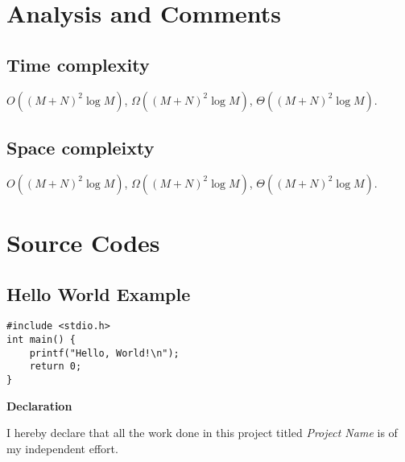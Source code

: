 \documentclass[10pt, twoside]{article}
\newcommand{\projectname}{
    Project Name
}
\begin{document}
\section{Analysis and Comments}

\subsection{Time complexity}

$O((M+N)^2 \log M)$, $\Omega((M+N)^2 \log M)$, $\Theta((M+N)^2 \log M)$.

\lipsum[4-6]


\subsection{Space compleixty}

\lipsum[2-5]

$O((M+N)^2 \log M)$, $\Omega((M+N)^2 \log M)$, $\Theta((M+N)^2 \log M)$.

\newpage

\section{Source Codes}

\subsection{Hello World Example}
\begin{verbatim}
#include <stdio.h>
int main() {
    printf("Hello, World!\n");
    return 0;
}
\end{verbatim}

\textbf{Declaration}

I hereby declare that all the work done in this project titled
\textit{\projectname} is of my independent effort.



\end{document}
